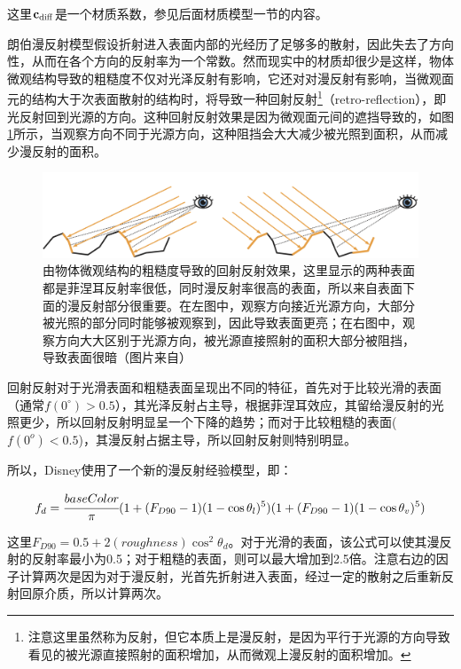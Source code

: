 \noindent 这里$\mathbf{c}_{\rm diff}$是一个材质系数，参见后面材质模型一节的内容。

朗伯漫反射模型假设折射进入表面内部的光经历了足够多的散射，因此失去了方向性，从而在各个方向的反射率为一个常数。然而现实中的材质却很少是这样，物体微观结构导致的粗糙度不仅对光泽反射有影响，它还对对漫反射有影响，当微观面元的结构大于次表面散射的结构时，将导致一种回射反射\footnote{注意这里虽然称为反射，但它本质上是漫反射，是因为平行于光源的方向导致看见的被光源直接照射的面积增加，从而微观上漫反射的面积增加。}（retro-reflection），即光反射回到光源的方向。这种回射反射效果是因为微观面元间的遮挡导致的，如图\ref{f:intro-retro-reflection}所示，当观察方向不同于光源方向，这种阻挡会大大减少被光照到面积，从而减少漫反射的面积。

\begin{figure}
	\includegraphics[width=\textwidth]{figures/intro/retro-reflection}
	\caption{由物体微观结构的粗糙度导致的回射反射效果，这里显示的两种表面都是菲涅耳反射率很低，同时漫反射率很高的表面，所以来自表面下面的漫反射部分很重要。在左图中，观察方向接近光源方向，大部分被光照的部分同时能够被观察到，因此导致表面更亮；在右图中，观察方向大大区别于光源方向，被光源直接照射的面积大部分被阻挡，导致表面很暗（图片来自\cite{b:rtr}）}
	\label{f:intro-retro-reflection}
\end{figure}

回射反射对于光滑表面和粗糙表面呈现出不同的特征，首先对于比较光滑的表面（通常$f(0^{\circ})>0.5$），其光泽反射占主导，根据菲涅耳效应，其留给漫反射的光照更少，所以回射反射明显呈一个下降的趋势；而对于比较粗糙的表面($f(0^o)<0.5$)，其漫反射占据主导，所以回射反射则特别明显。

所以，Disney使用了一个新的漫反射经验模型，即：

\begin{equation}\label{eq:intro-Disney-diff}
	f_d= \cfrac{baseColor}{\pi}(1+(F_{D90}-1)(1-\cos\theta_l)^5)(1+(F_{D90}-1)(1-\cos\theta_v)^5)
\end{equation} 

\noindent 这里$F_{D90}=0.5+2(roughness) \cos^2\theta_d$。对于光滑的表面，该公式可以使其漫反射的反射率最小为0.5；对于粗糙的表面，则可以最大增加到2.5倍。注意右边的因子计算两次是因为对于漫反射，光首先折射进入表面，经过一定的散射之后重新反射回原介质，所以计算两次。





